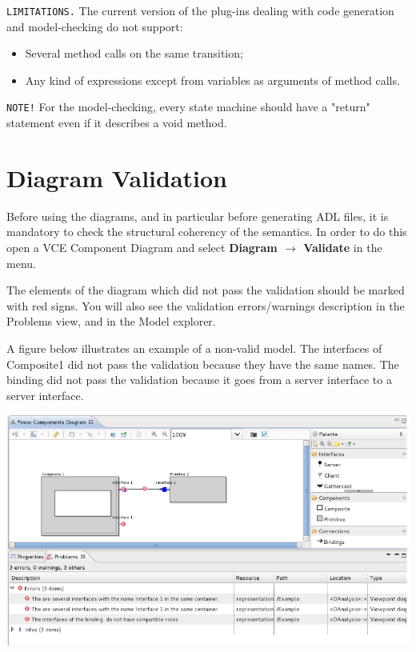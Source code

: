 \documentclass[12pt]{article}
\begin{document}
\texttt{LIMITATIONS.} The current version of the plug-ins dealing with code generation and model-checking do not support:

\begin{itemize}
\item
Several method calls on the same transition;
\item
Any kind of expressions except from variables as arguments of method calls.
\end{itemize}

\texttt{NOTE!} For the model-checking, every state machine should have a "return" statement even if it describes a void method.

\section{Diagram Validation}
Before using the diagrams, and in particular before generating ADL files, it is mandatory to check the structural coherency of the semantics. In order to do this open a VCE Component Diagram and select \textbf{Diagram $\rightarrow$ Validate} in the menu. 

The elements of the diagram which did not pass the validation should be marked with red signs. You will also see the validation errors/warnings description in the Problems view, and in the Model explorer.

A figure below illustrates an example of a non-valid model. The interfaces of Composite1 did not pass the validation because they have the same names. The binding did not pass the validation because it goes from a server interface to a server interface.

     \centerline{
     \includegraphics[width=14cm]{draws/valid.png}
     \label{fig:vce-proj}
     }
\end{document}
